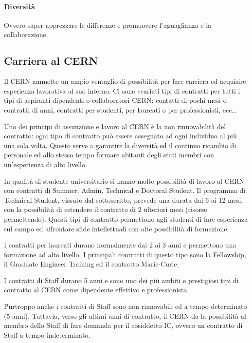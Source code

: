 			\paragraph{Diversit\`{a}}Ovvero saper apprezzare le differenze e promuovere l'uguaglianza e la collaborazione.
		
		\subsection{Carriera al CERN} \label{subsec:C;l;carriera}
		
			Il \ac{CERN} ammette un ampio ventaglio di possibilità per fare carriera ed acquisire esperienza lavorativa al suo interno. Ci sono svariati tipi di contratti per tutti i tipi di aspiranti dipendenti o collaboratori \ac{CERN}: contatti di pochi mesi o contratti di anni, contratti per studenti, per laureati o per professionisti, ecc\dots \cite{cern:carreer}
			
			Uno dei principi di assunzione e lavoro al \ac{CERN} è la non rinnovabilità del contratto: ogni tipo di contratto può essere assegnato ad ogni individuo al più una sola volta. Questo serve a garantire la diversità ed il continuo ricambio di personale ed allo stesso tempo formare abitanti degli stati membri con un'esperienza di alto livello.
			
			In qualità di studente universitario si hanno molte possibilità di lavoro al \ac{CERN} con contratti di Summer, Admin, Technical e Doctoral Student. Il programma di Technical Student, vissuto dal sottoscritto, prevede una durata dai 6 ai 12 mesi, con la possibilità di estendere il contratto di 2 ulteriori mesi (risorse permettendo). Questi tipi di contratto permettono agli studenti di fare esperienza sul campo ed affrontare sfide intellettuali con alte possibilità di formazione.
			
			I contratti per laureati durano normalmente dai 2 ai 3 anni e permettono una formazione ad alto livello. I principali contratti di questo tipo sono la Fellowship, il Graduate Engineer Training ed il contratto Marie-Curie.
			
			I contratti di Staff durano 5 anni e sono uno dei più ambiti e prestigiosi tipi di contratto al \ac{CERN} come dipendente effettivo e professionista.
			
			Purtroppo anche i contratti di Staff sono non rinnovabili ed a tempo determinato (5 anni). Tuttavia, verso gli ultimi anni di contratto, il \ac{CERN} da la possibilità al membro dello Staff di fare domanda per il cosiddetto \ac{IC}, ovvero un contratto di Staff a tempo indeterminato.
	
